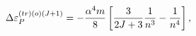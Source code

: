 \begin{equation}
\Delta \varepsilon _{P}^{\left( tr\right) \left( o\right) (J+1)}=-\frac{%
\alpha ^{4}m}{8}\left[ \frac{3}{2J+3}\frac{1}{n^{3}}-\frac{1}{n^{4}}\right] ,
\end{equation}

